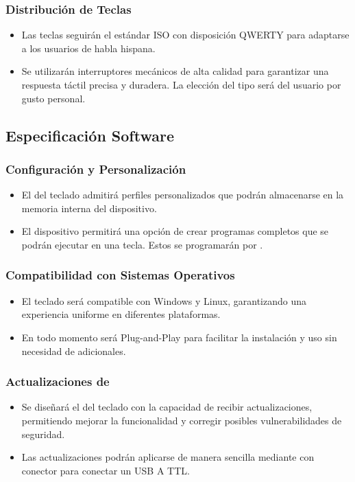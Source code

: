 \subsubsection{Distribución de Teclas} \label{DiseñoDistribucion}
\begin{itemize}
\item Las teclas seguirán el estándar \gls{ISO} con disposición \gls{QWERTY} para adaptarse a los usuarios de habla hispana.
\item Se utilizarán interruptores mecánicos de alta calidad para garantizar una respuesta táctil precisa y duradera. La elección del tipo será del usuario por gusto personal.
\end{itemize}

\subsection{Especificación Software} \label{DiseñoSoftware}

\subsubsection{Configuración y Personalización}
\begin{itemize}
\item El  del teclado admitirá perfiles personalizados que podrán almacenarse en la memoria interna del dispositivo.
\item El dispositivo permitirá una opción de crear programas completos que se podrán ejecutar en una tecla. Estos se programarán por .
\end{itemize}

\subsubsection{Compatibilidad con Sistemas Operativos}
\begin{itemize}
\item El teclado será compatible con \gls{Windows} y \gls{Linux}, garantizando una experiencia uniforme en diferentes plataformas.
\item En todo momento será \gls{Plug-and-Play} para facilitar la instalación y uso sin necesidad de  adicionales.
\end{itemize}

\subsubsection{Actualizaciones de }
\begin{itemize}
\item Se diseñará el  del teclado con la capacidad de recibir actualizaciones, permitiendo mejorar la funcionalidad y corregir posibles vulnerabilidades de seguridad.
\item Las actualizaciones podrán aplicarse de manera sencilla mediante con conector para conectar un \gls{USB} A \gls{TTL}.
\end{itemize}

